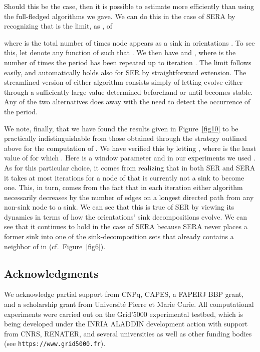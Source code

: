 \documentclass{article}
\begin{document}
Should this be the case, then it is possible to estimate  more
efficiently than using the full-fledged algorithms we gave. We can do this in
the case of SERA by recognizing that  is the limit, as
, of

where  is the total number of times node  appears as a sink
in orientations . To see this, let 
denote any function of  such that . We then have
 and
, where  is the number of times the period has
been repeated up to iteration . The limit follows easily, and automatically
holds also for SER by straightforward extension. The streamlined version of
either algorithm consists simply of letting  evolve either through a
sufficiently large value determined beforehand or until 
becomes stable. Any of the two alternatives does away with the need to detect
the occurrence of the period.

We note, finally, that we have found the results given in Figure~\ref{fig10}
to be practically indistinguishable from those obtained through the strategy
outlined above for the computation of . We have verified this by
letting , where  is the least value of
 for which
.
Here  is a window parameter and in our experiments we used .
As for this particular choice, it comes from realizing that in both SER and SERA
it takes at most  iterations for a node of  that is currently
not a sink to become one. This, in turn, comes from the fact that in each
iteration either algorithm necessarily decreases by  the number of edges on a
longest directed path from any non-sink node to a sink. We can see that this is
true of SER by viewing its dynamics in terms of how the orientations' sink
decompositions evolve. We can see that it continues to hold in the case of SERA
because SERA never places a former sink  into one of the sink-decomposition
sets that already contains a neighbor of  in  (cf.\ Figure~\ref{fig6}).

\subsection*{Acknowledgments}

We acknowledge partial support from CNPq, CAPES, a FAPERJ BBP grant, and a
scholarship grant from Universit\'{e} Pierre et Marie Curie.
All computational experiments were carried out on the Grid'5000 experimental
testbed, which is being developed under the INRIA ALADDIN development action
with support from CNRS, RENATER, and several universities as well as other
funding bodies (see \texttt{https://www.grid5000.fr}).



\end{document}
